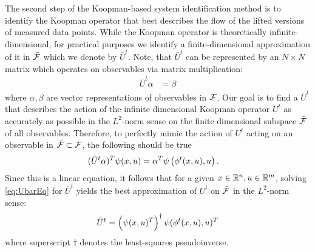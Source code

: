 The second step of the Koopman-based system identification method is to identify the Koopman operator that best describes the flow of the lifted versions of measured data points.
While the Koopman operator is theoretically infinite-dimensional, for practical purposes we identify a finite-dimensional approximation of it in $\bar{\mathcal{F}}$ which we denote by $\bar{U}^t$.
Note, that $\bar{U}^t$ can be represented by an $N \times N$ matrix which operates on observables via matrix multiplication:
\begin{align}
    \bar{U}^t {\alpha} &= {\beta} 
    \label{eq:Ubar}
\end{align}
where $\alpha, \beta$ are vector representations of observables in $\bar{\mathcal{F}}$.
Our goal is to find a $\bar{U}^t$ that describes the action of the infinite dimensional Koopman operator $U^t$ as accurately as possible in the $L^2$-norm sense on the finite dimensional subspace $\bar{\mathcal{F}}$  of all observables.
Therefore, to perfectly mimic the action of $U^t$ acting on an observable in $\bar{\mathcal{F}} \subset \mathcal{F}$, the following should be true
\begin{align}
    ( \bar{U}^t {\alpha} )^T {\psi}(x, u) &=
    {\alpha}^T {\psi} \left( \phi^t(x,u), u \right).
    \label{eq:UbarEq}
\end{align}
Since this is a linear equation, it follows that for a given ${x \in \mathbb{R}^n, u \in \mathbb{R}^m}$, solving \eqref{eq:UbarEq} for $\bar{U}^t$ yields the best approximation of $U^t$ on $\bar{\mathcal{F}}$ in the $L^2$-norm sense:
\begin{align}
    \bar{U}^t = \left( {\psi}(x, u)^T \right)^\dagger {\psi}( \phi^t(x,u), u )^T
    \label{eq:Uapprox}
\end{align}
where superscript $\dagger$ denotes the least-squares pseudoinverse.

